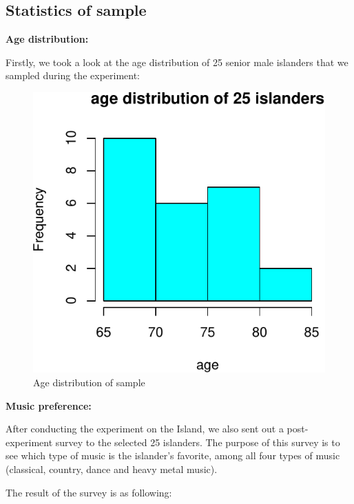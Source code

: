 \documentclass[]{article}
\begin{document}
\subsection{Statistics of sample}\label{statistics-of-sample}

\textbf{Age distribution: }

Firstly, we took a look at the age distribution of 25 senior male
islanders that we sampled during the experiment:

\begin{figure}
\centering
\includegraphics{STATS101B-Project_files/figure-latex/unnamed-chunk-2-1.pdf}
\caption{Age distribution of sample}
\end{figure}

\textbf{Music preference:}

After conducting the experiment on the Island, we also sent out a
post-experiment survey to the selected 25 islanders. The purpose of this
survey is to see which type of music is the islander's favorite, among
all four types of music (classical, country, dance and heavy metal
music).

The result of the survey is as following:
\end{document}
